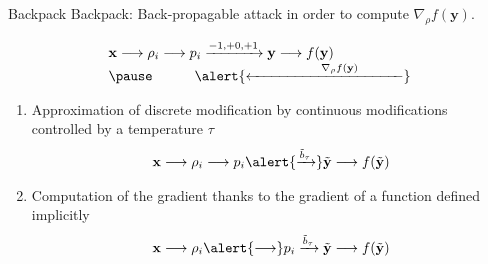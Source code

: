 \documentclass[10pt]{beamer}
\begin{document}
\begin{frame}{Backpack}
\alert{Backpack}: \alert{Back-p}ropagable att\alert{ack} \pause in order to compute \alert{$\nabla_{\rho} f(\mathbf{y})$}.

    \begin{equation*}
        \begin{array}{ll}
        \mathbf{x} \longrightarrow \rho_i \longrightarrow p_i \xrightarrow{-1, +0, +1} \mathbf{y} \longrightarrow f(\mathbf{y})
        \\ \pause
        \hspace{3em} \alert{\xleftarrow{\hspace{5em} \nabla_\rho f(\mathbf{y}) \hspace{3em}}}
        \end{array}
    \end{equation*}
    
    \pause
   \begin{enumerate}
       \item Approximation of discrete modification by continuous modifications controlled by a temperature $\tau$ 
       \begin{equation*}
       \begin{array}{ll}
            \mathbf{x} \longrightarrow \rho_i \longrightarrow p_i \alert{ \xrightarrow{\tilde{b}_\tau}} \tilde{\mathbf{y}} \longrightarrow f(\tilde{\mathbf{y}}) %
        \end{array}
        \end{equation*}
    
        \pause
       \item Computation of the gradient thanks to the gradient of a function defined implicitly
         \begin{equation*}
         \begin{array}{ll}
            \mathbf{x} \longrightarrow \rho_i \alert{\longrightarrow} p_i  \xrightarrow{\tilde{b}_\tau} \tilde{\mathbf{y}} \longrightarrow f(\tilde{\mathbf{y}}) %
        \end{array}
        \end{equation*}
   \end{enumerate}
\end{frame}
\end{document}
